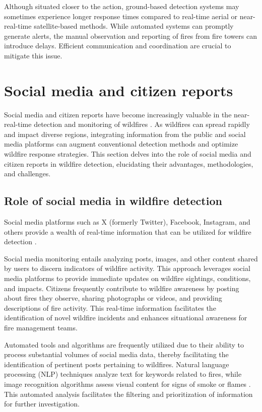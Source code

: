 \documentclass[
  12 pt,
]{Nemilov}
\begin{document}
Although situated closer to the action, ground-based detection systems may sometimes experience longer response times compared to real-time aerial or near-real-time satellite-based methods. While automated systems can promptly generate alerts, the manual observation and reporting of fires from fire towers can introduce delays. Efficient communication and coordination are crucial to mitigate this issue.

\section{Social media and citizen reports}\label{social-media-and-citizen-reports}

Social media and citizen reports have become increasingly valuable in the near-real-time detection and monitoring of wildfires \citep{slavkovikj2014review}. As wildfires can spread rapidly and impact diverse regions, integrating information from the public and social media platforms can augment conventional detection methods and optimize wildfire response strategies. This section delves into the role of social media and citizen reports in wildfire detection, elucidating their advantages, methodologies, and challenges.

\subsection{Role of social media in wildfire detection}\label{role-of-social-media-in-wildfire-detection}

Social media platforms such as X (formerly Twitter), Facebook, Instagram, and others provide a wealth of real-time information that can be utilized for wildfire detection \citep{lei2018can, slavkovikj2014review}.

Social media monitoring entails analyzing posts, images, and other content shared by users to discern indicators of wildfire activity. This approach leverages social media platforms to provide immediate updates on wildfire sightings, conditions, and impacts. Citizens frequently contribute to wildfire awareness by posting about fires they observe, sharing photographs or videos, and providing descriptions of fire activity. This real-time information facilitates the identification of novel wildfire incidents and enhances situational awareness for fire management teams.

Automated tools and algorithms are frequently utilized due to their ability to process substantial volumes of social media data, thereby facilitating the identification of pertinent posts pertaining to wildfires. Natural language processing (NLP) techniques analyze text for keywords related to fires, while image recognition algorithms assess visual content for signs of smoke or flames \citep{khurana2023natural, ma2024surveying}. This automated analysis facilitates the filtering and prioritization of information for further investigation.
\end{document}
